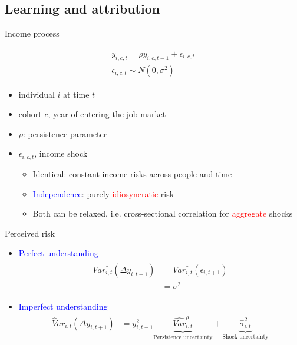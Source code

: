\documentclass{beamer}
\begin{document}
\subsection{Learning and attribution}

\begin{frame}{Income process}
	
	\begin{eqnarray}
	\begin{split}
	y_{i,c,t} = \rho y_{i,c,t-1} + \epsilon_{i,c,t} \\
	\epsilon_{i,c,t} \sim  N(0,\sigma^2)
	\end{split}
	\end{eqnarray}
	
	\begin{itemize}
		\item individual \(i\) at time
		\(t\) 
		\item cohort $c$, year of entering the job market 
		\item $\rho$: persistence parameter
		\item \(\epsilon_{i,c,t}\), income shock 
		\begin{itemize}
			\item Identical: constant income risks across people and time
			\item \textcolor{blue}{Independence}: purely \textcolor{red}{idiosyncratic} risk 
			\item  Both can be relaxed, i.e. cross-sectional correlation for \textcolor{red}{aggregate} shocks 
		\end{itemize}
	\end{itemize}
\end{frame}


\begin{frame}{Perceived risk}
\begin{itemize}
\item \textcolor{blue}{Perfect understanding}
\begin{eqnarray}
\begin{split}
Var^*_{i,t}(\Delta y_{i,t+1}) & = Var^*_{i,t}(\epsilon_{i,t+1}) \\
& = \sigma^2
\end{split}
\end{eqnarray}
\item \textcolor{blue}{Imperfect understanding} 
\begin{eqnarray}
\begin{split}
\widehat Var_{i,t}(\Delta y_{i,t+1}) & = y_{i,t-1}^2 \underbrace{\widehat{Var}^{\rho}_{i,t}}_{\text{Persistence uncertainty}} + \underbrace{\hat{\sigma}^2_{i,t}}_{\text{Shock uncertainty}}
\end{split}
\end{eqnarray}
\end{itemize}	
\end{frame}
\end{document}
